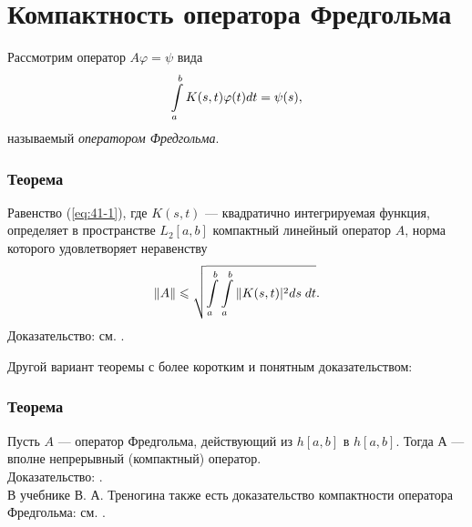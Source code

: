 \section{Компактность оператора Фредгольма}
\label{sec:q-41}
Рассмотрим оператор $A\varphi = \psi$ вида
\begin{equation}
	\int\displaylimits_a^b K(s, t) \varphi(t) dt = \psi(s), \label{eq:41-1}
\end{equation}
называемый \textit{оператором Фредгольма}.

\subsubsection*{Теорема}
Равенство (\ref{eq:41-1}), где $K(s, t)$ --- квадратично интегрируемая функция, определяет в пространстве $L_2[a, b]$ компактный линейный оператор $A$, норма которого удовлетворяет неравенству
$$\|A\| \leqslant \sqrt{\int\displaylimits_a^b\int\displaylimits_a^b\|K(s, t)|^2 ds \; dt}.$$
Доказательство: см. \cite[с.~461]{kolmogorov}.

Другой вариант теоремы с более коротким и понятным доказательством:
\subsubsection*{Теорема}
Пусть $A$ --- оператор Фредгольма, действующий из $h[a,b]$ в $h[a,b]$. Тогда $А$ --- вполне непрерывный (компактный) оператор.\\
Доказательство: \cite[с.~13]{msu-fa-2}.\\
В учебнике В. А. Треногина также есть доказательство компактности оператора Фредгольма: см. \cite[с.~208]{trenogin}.